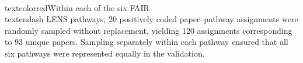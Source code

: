 \\textcolor{red}{Within each of the six FAIR\\textendash LENS pathways, 20 positively coded paper--pathway assignments were randomly sampled without replacement, yielding 120 assignments corresponding to 93 unique papers. Sampling separately within each pathway ensured that all six pathways were represented equally in the validation.}\n